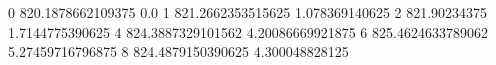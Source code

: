 0 820.1878662109375 0.0
1 821.2662353515625 1.078369140625
2 821.90234375 1.7144775390625
4 824.3887329101562 4.20086669921875
6 825.4624633789062 5.27459716796875
8 824.4879150390625 4.300048828125
